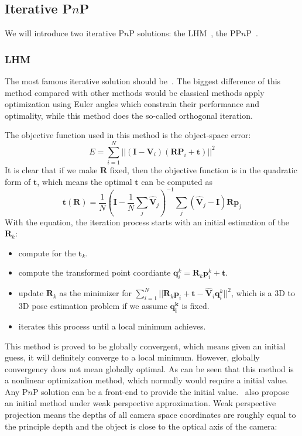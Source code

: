 \documentclass[a4paper]{report}
\begin{document}
\subsection{Iterative P$n$P}
We will introduce two iterative P$n$P solutions: the LHM~\cite{lu2000fast}, the PP$n$P~\cite{garro2012solving}.
\subsubsection{LHM}
The most famous iterative solution should be~\cite{lu2000fast}. The biggest difference of this method compared with other methods would be classical methods apply optimization using Euler angles which constrain their performance and optimality, while this method does the so-called orthogonal iteration. 

The objective function used in this method is the object-space error:
$$
E = \sum_{i=1}^{N} ||(\mathbf{I}-\mathbf{V}_i)(\mathbf{R}\mathbf{P}_i+\mathbf{t})||^2
$$
It is clear that if we make $\mathbf{R}$ fixed, then the objective function is in the quadratic form of $\mathbf{t}$, which means the optimal $\mathbf{t}$ can be computed as
$$
\mathbf{t}(\mathbf{R})=\frac{1}{N}(\mathbf{I}-\frac{1}{N}\sum_{j}\hat{\mathbf{V}}_j)^{-1} \sum_{j}(\hat{\mathbf{V}}_j-\mathbf{I})\mathbf{R}\mathbf{p}_j
$$
With the equation, the iteration process starts with an initial estimation of the $\mathbf{R}_k$:
\begin{itemize}
	\item compute for the $\mathbf{t}_k$.
	\item compute the transformed point coordiante $\mathbf{q}^k_i=\mathbf{R}_k\mathbf{p}^k_i+\mathbf{t}$.
	\item update $\mathbf{R}_k$ as the minimizer for $\sum_{i=1}^{N}||\mathbf{R}_k\mathbf{p}_i+\mathbf{t}-\hat{\mathbf{V}}_i\mathbf{q}^k_i||^2$, which is a $3$D to $3$D pose estimation problem if we assume $\mathbf{q_i^k}$ is fixed.
	\item iterates this process until a local minimum achieves.
\end{itemize}
This method is proved to be globally convergent, which means given an initial guess, it will definitely converge to a local minimum. However, globally convergency does not mean globally optimal. As can be seen that this method is a nonlinear optimization method, which normally would require a initial value. Any P$n$P solution can be a front-end to provide the initial value.~\cite{lu2000fast} also propose an initial method under weak perspective approximation. Weak perspective projection means the depths of all camera space coordinates are roughly equal to the principle depth and the object is close to the optical axis of the camera:
\end{document}

